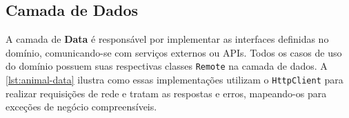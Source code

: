 \subsection{Camada de Dados}\label{subsec:camadaDados}

A camada de \textbf{Data} é responsável por implementar as interfaces definidas no domínio, comunicando-se com serviços externos ou \gls{API}s. Todos os casos de uso do domínio possuem suas respectivas classes \texttt{Remote} na camada de dados. A \autoref{lst:animal-data} ilustra como essas implementações utilizam o \texttt{HttpClient} para realizar requisições de rede e tratam as respostas e erros, mapeando-os para exceções de negócio compreensíveis.

\begin{center}
\end{center}
\vspace{-1.5\baselineskip}
